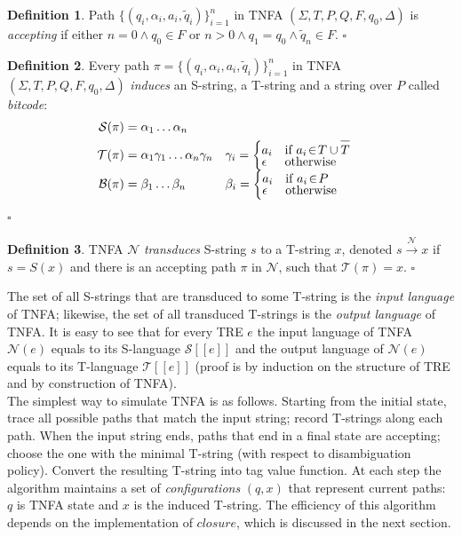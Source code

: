\documentclass{article}
\newcommand{\Xin}{\!\in\!}
\newcommand{\Xeq}{\!=\!}
\newcommand{\Xlb}{[\![}
\newcommand{\Xrb}{]\!]}
\newcommand{\XB}{\mathcal{B}}
\newcommand{\XN}{\mathcal{N}}
\newcommand{\XS}{\mathcal{S}}
\newcommand{\XT}{\mathcal{T}}
\newcommand*{\Xbar}[1]{\overline{#1\vphantom{\bar{#1}}}}
\theoremstyle{definition}
\newtheorem{Xdef}{Definition}
\begin{document}
\begin{multicols}{2}
    \begin{Xdef}
    Path $\{(q_i, \alpha_i, a_i, \widetilde{q}_i)\}_{i=1}^n$ in TNFA $(\Sigma, T, P, Q, F, q_0, \Delta)$ is \emph{accepting}
    if either $n \Xeq 0 \wedge q_0 \Xin F$ or $n\!>\!0 \wedge q_1 \Xeq q_0 \wedge \widetilde{q}_n \Xin F$.
    $\square$
    \end{Xdef}

    \begin{Xdef}
    Every path $\pi \Xeq \{(q_i, \alpha_i, a_i, \widetilde{q}_i)\}_{i=1}^n$
    in TNFA $(\Sigma, T, P, Q, F, q_0, \Delta)$
    \emph{induces} an S-string, a T-string and a string over $P$ called \emph{bitcode}:
    \begin{align*}
    \XS(\pi) &= \alpha_1 \dots \alpha_n \\
    \XT(\pi) &= \alpha_1 \gamma_1 \dots \alpha_n \gamma_n
    &&\gamma_i = \begin{cases}
            a_i &\text{if } a_i \Xin T \cup \Xbar{T} \\[-0.5em]
            \epsilon &\text{otherwise}
        \end{cases} \\[-0.5em]
    \XB(\pi) &= \beta_1 \dots \beta_n
    &&\beta_i = \begin{cases}
            a_i &\text{if } a_i \Xin P \\[-0.5em]
            \epsilon &\text{otherwise}
        \end{cases}
    \end{align*}
    $\square$
    \end{Xdef}

    \begin{Xdef}
    TNFA $\XN$ \emph{transduces} S-string $s$ to a T-string $x$, denoted $s \xrightarrow{\XN} x$
    if $s \Xeq S(x)$ and there is an accepting path $\pi$ in $\XN$, such that $\XT(\pi) \Xeq x$.
    $\square$
    \end{Xdef}

The set of all S-strings that are transduced to some T-string is the \emph{input language} of TNFA;
likewise, the set of all transduced T-strings is the \emph{output language} of TNFA.
It is easy to see that for every TRE $e$ the input language of TNFA $\XN(e)$ equals to its S-language $\XS \Xlb e \Xrb$
and the output language of $\XN(e)$ equals to its T-language $\XT \Xlb e \Xrb$
(proof is by induction on the structure of TRE and by construction of TNFA).
\\

The simplest way to simulate TNFA is as follows.
Starting from the initial state, trace all possible paths that match the input string; record T-strings along each path.
When the input string ends, paths that end in a final state are accepting;
choose the one with the minimal T-string (with respect to disambiguation policy).
Convert the resulting T-string into tag value function.
At each step the algorithm maintains a set of \emph{configurations} $(q, x)$ that represent current paths:
$q$ is TNFA state and $x$ is the induced T-string.
The efficiency of this algorithm depends on the implementation of $closure$, which is discussed in the next section.
\\


\end{multicols}
\end{document}
